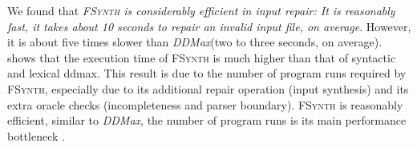\documentclass[sigconf,review,anonymous]{acmart}
\newcommand{\recheck}[1]{\textcolor{red}{#1}}
\newcommand{\approach}{\textsc{FSynth}\xspace}
\newcommand{\ddmax}{\textit{DDMax}\xspace}
\begin{document}
We found that \textit{\approach is considerably efficient in input repair: It is reasonably fast, it takes about 10 seconds to repair an invalid input file, on average}. However, it is about five times slower than \ddmax (two to three seconds, on average). 
shows %
that the execution time
of \approach %
is much higher %
than that of syntactic and lexical ddmax. 
This result is %
due to the %
number of program runs required by \approach, especially due to its additional repair operation (input synthesis) and its extra oracle checks (incompleteness and parser boundary).
\approach is reasonably efficient, similar to \ddmax, the number of program runs 
is its main performance bottleneck . %
\end{document}
